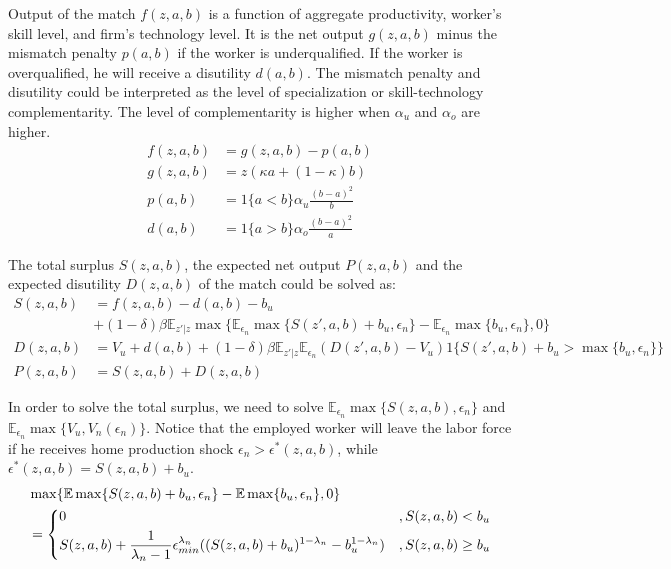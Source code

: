 \documentclass[12pt]{article}
\newcommand{\E}{\mathbb{E}}
\newcommand{\1}{\mathbb{1}}
\begin{document}
Output of the match $f(z,a,b)$ is a function of aggregate productivity, worker's skill level, and firm's technology level. It is the net output $g(z,a,b)$ minus the mismatch penalty $p(a,b)$ if the worker is underqualified. If the worker is overqualified, he will receive a disutility $d(a,b)$. The mismatch penalty and disutility could be interpreted as the level of specialization or skill-technology complementarity. The level of complementarity is higher when $\alpha_u$ and $\alpha_o$ are higher.
\begin{align*}
f(z,a,b) &= g(z,a,b)-p(a,b) \\
g(z,a,b) &= z(\kappa a+(1-\kappa) b)\\
p(a,b) &= 1\{a<b\}\alpha_u\frac{(b-a)^2}{b} \\
d(a,b) &= 1\{a>b\}\alpha_o\frac{(b-a)^2}{a}
\end{align*}

The total surplus $S(z,a,b)$, the expected net output $P(z,a,b)$ and the expected disutility $D(z,a,b)$ of the match could be solved as: 
\begin{align*}
S(z,a,b) &= f(z,a,b)-d(a,b)-b_u \\
			 &+(1-\delta)\beta \E_{z'|z}\max\{\E_{\epsilon_n}\max\{S(z',a,b)+b_u,\epsilon_n\}-\E_{\epsilon_n}\max\{b_u,\epsilon_n\},0 \}  \\
D(z,a,b) &=V_u+d(a,b)+(1-\delta)\beta \E_{z'|z}\E_{\epsilon_n}(D(z',a,b)-V_u)1\{{S(z',a,b)+b_u>\max\{b_u,\epsilon_n\}}\} \\
P(z,a,b) &= S(z,a,b)+D(z,a,b)
\end{align*}

In order to solve the total surplus, we need to solve $\E_{\epsilon_n}\max\{S(z,a,b),\epsilon_n\}$ and $\E_{\epsilon_n}\max\{V_u,V_n(\epsilon_n)\}$. Notice that the employed worker will leave the labor force if he receives home production shock $\epsilon_n>\epsilon^*(z,a,b)$, while $\epsilon^*(z,a,b) = S(z,a,b)+b_u$. 
\begin{align*}
&\max\{\E\max\{S(z,a,b)+b_u,\epsilon_n\}-\E\max\{b_u,\epsilon_n\},0 \}   \\
&= \begin{dcases}
0 & ,S(z,a,b) < b_u \\
S(z,a,b) +\frac{1}{\lambda_n-1}\epsilon_{min}^{\lambda_n}((S(z,a,b)+b_u)^{1-\lambda_n}-b_u^{1-\lambda_n}) & ,S(z,a,b)\geq b_u 
\end{dcases}
\end{align*}	
\end{document}
